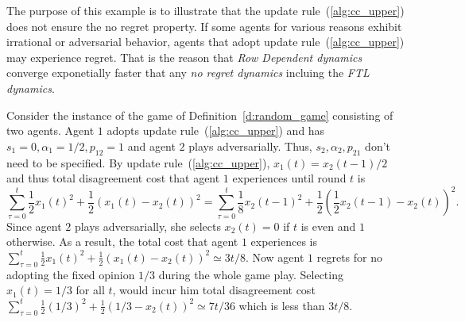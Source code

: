 \begin{example}\label{regret_side_result}
The purpose of this example is to illustrate that 
the update rule~(\ref{alg:cc_upper}) does not ensure the no regret
property. If some agents for various reasons exhibit
irrational or adversarial behavior, agents that adopt update 
rule~(\ref{alg:cc_upper}) may experience regret. That is the reason
that \emph{Row Dependent dynamics} converge exponetially faster that any
\emph{no regret dynamics} incluing the \emph{FTL dynamics}.

Consider the instance of the game of Definition~\ref{d:random_game} consisting
of two agents. Agent $1$ adopts update rule~(\ref{alg:cc_upper}) and
has $s_1=0,\alpha_1=1/2,p_{12}=1$ and agent $2$ plays adversarially. Thus,
$s_2,\alpha_2,p_{21}$ don't need to be specified. By update rule~(\ref{alg:cc_upper}),
$x_1(t)=x_2(t-1)/2$ and thus total disagreement cost that agent $1$ experiences until
round $t$ is 
\begin{equation*}
 \sum_{\tau=0}^t\frac{1}{2}x_1(t)^2+\frac{1}{2}(x_1(t) - x_2(t))^2 =
 \sum_{\tau=0}^t\frac{1}{8}x_2(t-1)^2 + \frac{1}{2}(\frac{1}{2}x_2(t-1)-x_2(t))^2.
\end{equation*}
Since agent $2$ plays adversarially, she selects $x_2(t)=0$ if $t$ is even
and $1$ otherwise. As a result, the total cost that agent $1$ experiences is
$\sum_{\tau=0}^t \frac{1}{2}x_1(t)^2+\frac{1}{2}(x_1(t) - x_2(t))^2 \simeq 3t/8$.
Now agent $1$ regrets for no adopting the fixed opinion $1/3$ during the whole game play.
Selecting $x_1(t)=1/3$ for all $t$, would incur him total disagreement cost
$\sum_{\tau=0}^t\frac{1}{2}(1/3)^2+\frac{1}{2}(1/3 - x_2(t))^2\simeq 7t/36$
which is less than $3t/8$.
\end{example}
